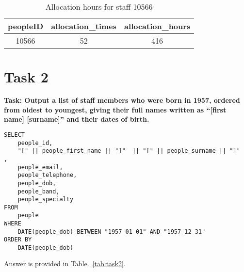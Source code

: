 \documentclass{article}
\begin{document}
\begin{table}[H]
    \centering
    \begin{tabular}{|c|c|c|}
        \hline
        peopleID & allocation\_times & allocation\_hours \\
        \hline
        10566 & 52 & 416 \\
        \hline
    \end{tabular}
    \caption{Allocation hours for staff 10566}
    \label{tab:task1}
\end{table}

\section{Task 2}

\textbf{Task: Output a list of staff members who were born in 1957, ordered from oldest to youngest, giving their full names written as “[first name] [surname]” and their dates of birth.}


\begin{lstlisting}[style=sqlstyle]
SELECT
    people_id,
    "[" || people_first_name || "]"  || "[" || people_surname || "]"  ,
    people_email,
    people_telephone,
    people_dob,
    people_band,
    people_specialty
FROM 
    people
WHERE 
    DATE(people_dob) BETWEEN "1957-01-01" AND "1957-12-31" 
ORDER BY
    DATE(people_dob)

\end{lstlisting}

Answer is provided in Table.~\ref{tab:task2}.
\end{document}

